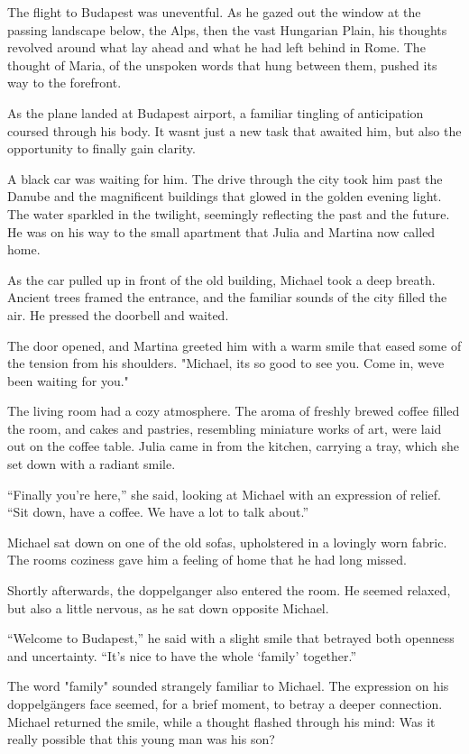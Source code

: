 \documentclass[
]{article}
\begin{document}
The flight to Budapest was uneventful. As he gazed out the window at the passing landscape below, the Alps, then the vast Hungarian Plain, his thoughts revolved around what lay ahead and what he had left behind in Rome. The thought of Maria, of the unspoken words that hung between them, pushed its way to the forefront.

As the plane landed at Budapest airport, a familiar tingling of anticipation coursed through his body. It wasn\textquotesingle t just a new task that awaited him, but also the opportunity to finally gain clarity.

A black car was waiting for him. The drive through the city took him past the Danube and the magnificent buildings that glowed in the golden evening light. The water sparkled in the twilight, seemingly reflecting the past and the future. He was on his way to the small apartment that Julia and Martina now called home.

As the car pulled up in front of the old building, Michael took a deep breath. Ancient trees framed the entrance, and the familiar sounds of the city filled the air. He pressed the doorbell and waited.



The door opened, and Martina greeted him with a warm smile that eased some of the tension from his shoulders. "Michael, it\textquotesingle s so good to see you. Come in, we\textquotesingle ve been waiting for you."

The living room had a cozy atmosphere. The aroma of freshly brewed coffee filled the room, and cakes and pastries, resembling miniature works of art, were laid out on the coffee table. Julia came in from the kitchen, carrying a tray, which she set down with a radiant smile.

``Finally you're here,'' she said, looking at Michael with an expression of relief. ``Sit down, have a coffee. We have a lot to talk about.''

Michael sat down on one of the old sofas, upholstered in a lovingly worn fabric. The room\textquotesingle s coziness gave him a feeling of home that he had long missed.

Shortly afterwards, the doppelganger also entered the room. He seemed relaxed, but also a little nervous, as he sat down opposite Michael.

``Welcome to Budapest,'' he said with a slight smile that betrayed both openness and uncertainty. ``It's nice to have the whole `family' together.''

The word "family" sounded strangely familiar to Michael. The expression on his doppelgänger\textquotesingle s face seemed, for a brief moment, to betray a deeper connection. Michael returned the smile, while a thought flashed through his mind: Was it really possible that this young man was his son?
\end{document}
